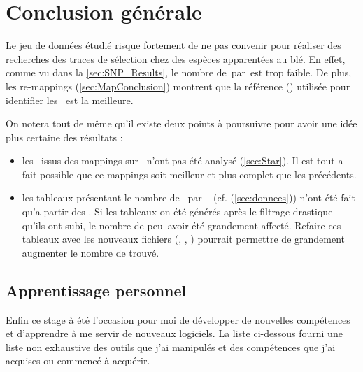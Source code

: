 \documentclass[../main]{subfiles} %
\begin{document}
\addto\extrasfrench{\protected\edef:{\unexpanded\expandafter{:}}}

\section{Conclusion générale}

Le jeu de données étudié risque fortement de ne pas convenir pour réaliser des recherches des traces de sélection chez des espèces apparentées au blé. En effet, comme vu dans la \cref{sec:SNP_Results}, le nombre de \SNP\,par \contigs\,est trop faible. De plus, les re-\glspl{mapping} (\cref{sec:MapConclusion}) montrent que la référence (\TrEx) utilisée pour identifier les  \SNP est la meilleure. 

On notera tout de même qu'il existe deux points à poursuivre pour avoir une idée plus certaine des résultats :

\begin{itemize}
    \item les \bam issus des \glspl{mapping} sur \GeMo n'ont pas été analysé (\cref{sec:Star}). Il est tout a fait possible que ce \glspl{mapping} soit meilleur et plus complet que les précédents.

    \item les tableaux présentant le nombre de \SNP par \contigs  (cf. (\cref{sec:donnees})) n'ont été fait qu'a partir des \OldBam. Si les tableaux on été générés après le filtrage drastique qu'ils ont subi, le nombre de \SNP peu avoir été grandement affecté. Refaire ces tableaux avec les nouveaux fichiers (\BamGeStar, \BamTrEx, \BamTrMo) pourrait permettre de grandement augmenter le nombre de \SNP trouvé.
\end{itemize}

\subsection{Apprentissage personnel}


Enfin ce stage à été l'occasion pour moi de développer de nouvelles compétences et d'apprendre à me servir de nouveaux logiciels. La liste ci-dessous fourni une liste non exhaustive des outils que j'ai manipulés et des compétences que j'ai acquises ou commencé à acquérir.






\end{document}
